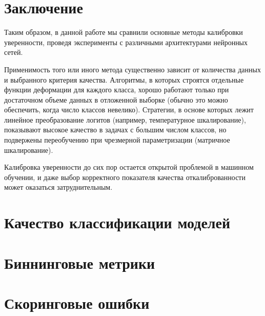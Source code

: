 \documentclass[12pt]{article}
\begin{document}
\section{Заключение}
Таким образом, в данной работе мы сравнили основные методы калибровки уверенности, проведя эксперименты с различными архитектурами нейронных сетей.

Применимость того или иного метода существенно зависит от количества данных и выбранного критерия качества. Алгоритмы, в которых строятся отдельные функции деформации для каждого класса, хорошо работают только при достаточном объеме данных в отложенной выборке (обычно это можно обеспечить, когда число классов невелико). Стратегии, в основе которых лежит линейное преобразование логитов (например, температурное шкалирование), показывают высокое качество в задачах с большим числом классов, но подвержены переобучению при чрезмерной параметризации (матричное шкалирование).

Калибровка уверенности до сих пор остается открытой проблемой в машинном обучении, и даже выбор корректного показателя качества откалиброванности может оказаться затруднительным.

\newpage
\printbibliography[
    heading=bibintoc,
    title={Список литературы}
]

\newpage
\begin{appendices}\label{sec:appendix}
\section{Качество классификации моделей}


\clearpage

\section{Биннинговые метрики}






\clearpage

\section{Скоринговые ошибки}





\end{appendices}
\end{document}
